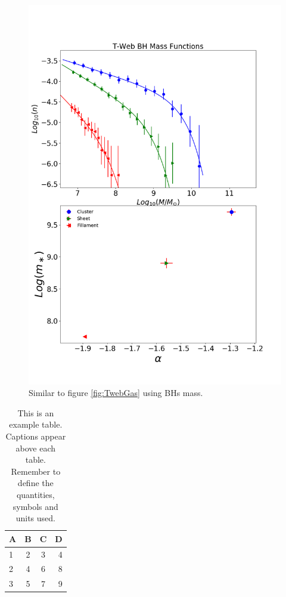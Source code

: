 \documentclass[a4paper,fleqn,usenatbib]{mnras}
\begin{document}
\begin{figure}
	\includegraphics[width=\columnwidth]{./pics/F19_T-Web_BH.png}
    \caption{Similar to figure \ref{fig:TwebGas} using BHs mass.} 
    \label{fig:TwebBH}
\end{figure}

\begin{table}
	\centering
	\caption{This is an example table. Captions appear above each table.
	Remember to define the quantities, symbols and units used.}
	\label{tab:example_table}
	\begin{tabular}{lccr} %
		\hline
		A & B & C & D\\
		\hline
		1 & 2 & 3 & 4\\
		2 & 4 & 6 & 8\\
		3 & 5 & 7 & 9\\
		\hline
	\end{tabular}
\end{table}
\end{document}
